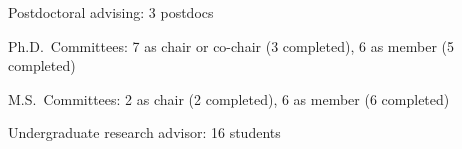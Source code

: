 \begin{veryTightItemize}
    \item Postdoctoral advising: 3 postdocs
    \item Ph.D.\ Committees: 7 as chair or co-chair (3 completed), 6 as member (5 completed)
    \item M.S.\ Committees:  2 as chair (2 completed), 6 as member (6 completed)
    \item Undergraduate research advisor: 16 students
\end{veryTightItemize}
